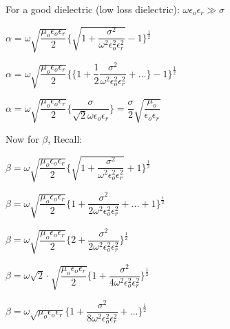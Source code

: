 For a good dielectric (low loss dielectric): $\omega\epsilon_{o}\epsilon_{r} \gg \sigma$

\begin{center}
	$\alpha = \omega\sqrt{\dfrac{\mu_{o}\epsilon_{o}\epsilon_{r}}{2}}\Bigg\{{\sqrt{1 + \dfrac{\sigma^{2}}{\omega^{2}\epsilon_{o}^{2}\epsilon_{r}^{2}}}} - 1\Bigg\}^{\frac{1}{2}}$
\end{center}

\begin{center}
	$\alpha = \omega\sqrt{\dfrac{\mu_{o}\epsilon_{o}\epsilon_{r}}{2}}\Bigg\{\bigg\{1 + \dfrac{1}{2} \dfrac{\sigma^{2}}{\omega^{2}\epsilon_{o}^{2}\epsilon_{r}^{2}} + \dots\bigg\} - 1\Bigg\}^{\frac{1}{2}}$
\end{center}

\begin{center}
	$\alpha = \omega\sqrt{\dfrac{\mu_{o}\epsilon_{o}\epsilon_{r}}{2}}\Bigg\{\dfrac{\sigma}{\sqrt{2}\omega\epsilon_{o}\epsilon_{r}}\Bigg\} =\dfrac{\sigma}{2}\sqrt{\dfrac{\mu_{o}}{\epsilon_{o}\epsilon_{r}}}$
\end{center}

Now for $\beta$, Recall:
\begin{center}
$\beta = \omega\sqrt{\dfrac{\mu_{o}\epsilon_{o}\epsilon_{r}}{2}}\Bigg\{{\sqrt{1 + \dfrac{\sigma^{2}}{\omega^{2}\epsilon_{o}^{2}\epsilon_{r}^{2}}}} + 1\Bigg\}^{\frac{1}{2}}$
\end{center}

\begin{center}
$\beta = \omega\sqrt{\dfrac{\mu_{o}\epsilon_{o}\epsilon_{r}}{2}}\Bigg\{1 + \dfrac{\sigma^{2}}{2\omega^{2}\epsilon_{o}^{2}\epsilon_{r}^{2}} + \dots + 1\Bigg\}^{\frac{1}{2}}$
\end{center}

\begin{center}
$\beta = \omega\sqrt{\dfrac{\mu_{o}\epsilon_{o}\epsilon_{r}}{2}}\Bigg\{2 + \dfrac{\sigma^{2}}{2\omega^{2}\epsilon_{o}^{2}\epsilon_{r}^{2}}\Bigg\}^{\frac{1}{2}}$
\end{center}

\begin{center}
	$\beta = \omega\sqrt{2}\cdot\sqrt{\dfrac{\mu_{o}\epsilon_{o}\epsilon_{r}}{2}}\Bigg\{1 + \dfrac{\sigma^{2}}{4\omega^{2}\epsilon_{o}^{2}\epsilon_{r}^{2}}\Bigg\}^{\frac{1}{2}}$
\end{center}

\begin{center}
	$\beta = \omega\sqrt{\mu_{o}\epsilon_{o}\epsilon_{r}}\Bigg\{1 + \dfrac{\sigma^{2}}{8\omega^{2}\epsilon_{o}^{2}\epsilon_{r}^{2}} + \dots\Bigg\}^{\frac{1}{2}}$
\end{center}


